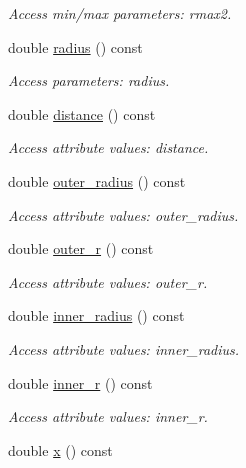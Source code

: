 \begin{DoxyCompactItemize}
\begin{DoxyCompactList}\small\item\em Access min/max parameters\+: rmax2. \end{DoxyCompactList}\item 
double \hyperlink{struct_d_d4hep_1_1_x_m_l_1_1_child_value_af4bd6d924d8436f5632cd9baeb86738f}{radius} () const
\begin{DoxyCompactList}\small\item\em Access parameters\+: radius. \end{DoxyCompactList}\item 
double \hyperlink{struct_d_d4hep_1_1_x_m_l_1_1_child_value_af031fedd108c4b35c0d606cb95993a2a}{distance} () const
\begin{DoxyCompactList}\small\item\em Access attribute values\+: distance. \end{DoxyCompactList}\item 
double \hyperlink{struct_d_d4hep_1_1_x_m_l_1_1_child_value_a75e18f3004c75bbb22581645f5d94dd3}{outer\+\_\+radius} () const
\begin{DoxyCompactList}\small\item\em Access attribute values\+: outer\+\_\+radius. \end{DoxyCompactList}\item 
double \hyperlink{struct_d_d4hep_1_1_x_m_l_1_1_child_value_adeddc36a118a782d7f1b3e0fcaa5cc62}{outer\+\_\+r} () const
\begin{DoxyCompactList}\small\item\em Access attribute values\+: outer\+\_\+r. \end{DoxyCompactList}\item 
double \hyperlink{struct_d_d4hep_1_1_x_m_l_1_1_child_value_af11c2070dd21b9627cbdebbcc47e1172}{inner\+\_\+radius} () const
\begin{DoxyCompactList}\small\item\em Access attribute values\+: inner\+\_\+radius. \end{DoxyCompactList}\item 
double \hyperlink{struct_d_d4hep_1_1_x_m_l_1_1_child_value_a812c18cc065b413bf0340c94a7a42edc}{inner\+\_\+r} () const
\begin{DoxyCompactList}\small\item\em Access attribute values\+: inner\+\_\+r. \end{DoxyCompactList}\item 
double \hyperlink{struct_d_d4hep_1_1_x_m_l_1_1_child_value_a168ba7d1aeb20b9ae1e2423f03834bdc}{x} () const

\end{DoxyCompactItemize}
